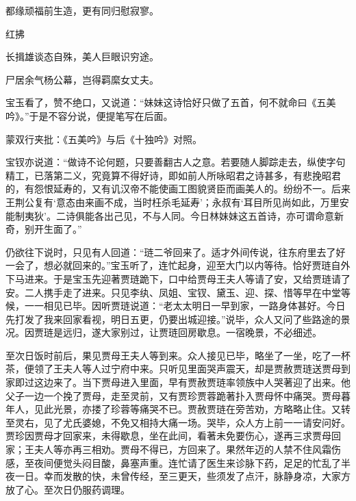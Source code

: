 \begin{poem}
    \begin{pl}

        都缘顽福前生造，更有同归慰寂寥。
    \end{pl}


    \emptypl


    \begin{pl}


        红拂
    \end{pl}


    \begin{pl}

        长揖雄谈态自殊，美人巨眼识穷途。
    \end{pl}


    \begin{pl}

        尸居余气杨公幕，岂得羁縻女丈夫。
    \end{pl}


\end{poem}


\begin{parag}
    宝玉看了，赞不绝口，又说道：“妹妹这诗恰好只做了五首，何不就命曰《五美吟》。”于是不容分说，便提笔写在后面。\begin{note}蒙双行夹批：《五美吟》与后《十独吟》对照。\end{note}宝钗亦说道：“做诗不论何题，只要善翻古人之意。若要随人脚踪走去，纵使字句精工，已落第二义，究竟算不得好诗，即如前人所咏昭君之诗甚多，有悲挽昭君的，有怨恨延寿的，又有讥汉帝不能使画工图貌贤臣而画美人的。纷纷不一。后来王荆公复有‘意态由来画不成，当时枉杀毛延寿’；永叔有‘耳目所见尚如此，万里安能制夷狄’。二诗俱能各出己见，不与人同。今日林妹妹这五首诗，亦可谓命意新奇，别开生面了。”
\end{parag}


\begin{parag}
    仍欲往下说时，只见有人回道：“琏二爷回来了。适才外间传说，往东府里去了好一会了，想必就回来的。”宝玉听了，连忙起身，迎至大门以内等待。恰好贾琏自外下马进来。于是宝玉先迎著贾琏跪下，口中给贾母王夫人等请了安，又给贾琏请了安。二人携手走了进来。只见李纨、凤姐、宝钗、黛玉、迎、探、惜等早在中堂等候，一一相见已毕。因听贾琏说道：“老太太明日一早到家，一路身体甚好。今日先打发了我来回家看视，明日五更，仍要出城迎接。”说毕，众人又问了些路途的景况。因贾琏是远归，遂大家别过，让贾琏回房歇息。一宿晚景，不必细述。
\end{parag}


\begin{parag}
    至次日饭时前后，果见贾母王夫人等到来。众人接见已毕，略坐了一坐，吃了一杯茶，便领了王夫人等人过宁府中来。只听见里面哭声震天，却是贾赦贾琏送贾母到家即过这边来了。当下贾母进入里面，早有贾赦贾琏率领族中人哭著迎了出来。他父子一边一个挽了贾母，走至灵前，又有贾珍贾蓉跪著扑入贾母怀中痛哭。贾母暮年人，见此光景，亦搂了珍蓉等痛哭不已。贾赦贾琏在旁苦劝，方略略止住。又转至灵右，见了尤氏婆媳，不免又相持大痛一场。哭毕，众人方上前一一请安问好。贾珍因贾母才回家来，未得歇息，坐在此间，看著未免要伤心，遂再三求贾母回家；王夫人等亦再三相劝。贾母不得已，方回来了。果然年迈的人禁不住风霜伤感，至夜间便觉头闷目酸，鼻塞声重。连忙请了医生来诊脉下药，足足的忙乱了半夜一日。幸而发散的快，未曾传经，至三更天，些须发了点汗，脉静身凉，大家方放了心。至次日仍服药调理。
\end{parag}


